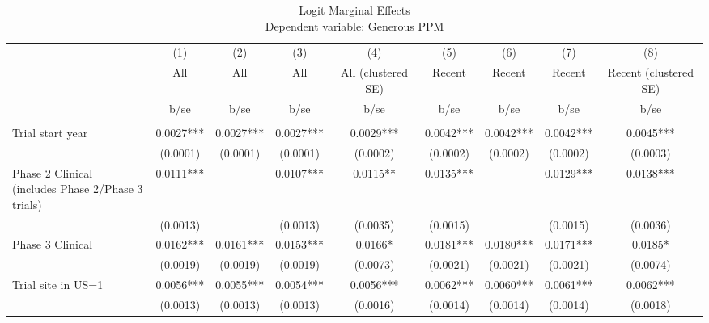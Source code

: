 
\begin{table}[htb]\centering
\caption{Logit Marginal Effects\\Dependent variable: Generous PPM}
\begin{tabular}{l*{8}c}

 & (1) & (2) & (3) & (4) & (5) & (6) & (7) & (8)  \\
 & All & All & All & All (clustered SE) & Recent & Recent & Recent & Recent (clustered SE)  \\

                    &        b/se   &        b/se   &        b/se   &        b/se   &        b/se   &        b/se   &        b/se   &        b/se   \\

\hline

       &               &               &               &               &               &               &               &               \\
Trial start year    &      0.0027***&      0.0027***&      0.0027***&      0.0029***&      0.0042***&      0.0042***&      0.0042***&      0.0045***\\
                    &    (0.0001)   &    (0.0001)   &    (0.0001)   &    (0.0002)   &    (0.0002)   &    (0.0002)   &    (0.0002)   &    (0.0003)   \\
\shortstack[l]{Phase 2 Clinical\\(includes Phase 2/Phase 3 trials)}&      0.0111***&               &      0.0107***&      0.0115** &      0.0135***&               &      0.0129***&      0.0138***\\
                    &    (0.0013)   &               &    (0.0013)   &    (0.0035)   &    (0.0015)   &               &    (0.0015)   &    (0.0036)   \\
Phase 3 Clinical    &      0.0162***&      0.0161***&      0.0153***&      0.0166*  &      0.0181***&      0.0180***&      0.0171***&      0.0185*  \\
                    &    (0.0019)   &    (0.0019)   &    (0.0019)   &    (0.0073)   &    (0.0021)   &    (0.0021)   &    (0.0021)   &    (0.0074)   \\
Trial site in US=1  &      0.0056***&      0.0055***&      0.0054***&      0.0056***&      0.0062***&      0.0060***&      0.0061***&      0.0062***\\
                    &    (0.0013)   &    (0.0013)   &    (0.0013)   &    (0.0016)   &    (0.0014)   &    (0.0014)   &    (0.0014)   &    (0.0018)   \\

\end{tabular}
\end{table}
